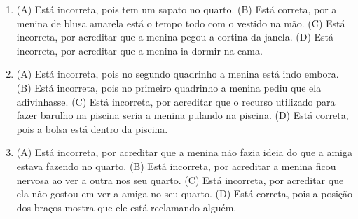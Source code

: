 
\begin{enumerate}
\item
(A) Está incorreta, pois tem um sapato no quarto.
(B) Está correta, por a menina de blusa amarela está o tempo todo com o
vestido na mão.
(C) Está incorreta, por acreditar que a menina pegou a cortina da janela.
(D) Está incorreta, por acreditar que a menina ia dormir na cama.

\item
(A) Está incorreta, pois no segundo quadrinho a menina está indo embora.
(B) Está incorreta, pois no primeiro quadrinho a menina pediu que ela
adivinhasse.
(C) Está incorreta, por acreditar que o recurso utilizado para fazer
barulho na piscina seria a menina pulando na piscina.
(D) Está correta, pois a bolsa está dentro da
piscina.

\item
(A) Está incorreta, por acreditar que a menina não fazia ideia do que a
amiga estava fazendo no quarto.
(B) Está incorreta, por acreditar a menina ficou nervosa ao ver a outra
nos seu quarto.
(C) Está incorreta, por acreditar que ela não gostou em ver a amiga no
seu quarto.
(D) Está correta, pois a posição dos braços mostra que ele está
reclamando alguém.
\end{enumerate}